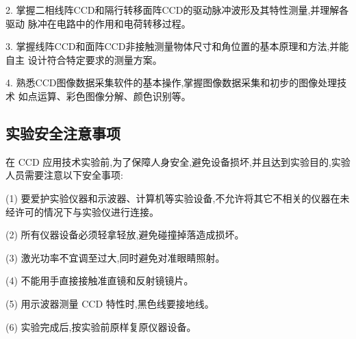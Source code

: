 \documentclass{ctexart}
\begin{document}
2. 掌握二相线阵CCD和隔行转移面阵CCD的驱动脉冲波形及其特性测量,并理解各驱动
脉冲在电路中的作用和电荷转移过程。

3. 掌握线阵CCD和面阵CCD非接触测量物体尺寸和角位置的基本原理和方法,并能自主
设计符合特定要求的测量方案。

4. 熟悉CCD图像数据采集软件的基本操作,掌握图像数据采集和初步的图像处理技术
如点运算、彩色图像分解、颜色识别等。

\subsection{实验安全注意事项}
在 CCD 应用技术实验前,为了保障人身安全,避免设备损坏,并且达到实验目的,实验
人员需要注意以下安全事项:

(1) 要爱护实验仪器和示波器、计算机等实验设备,不允许将其它不相关的仪器在未
经许可的情况下与实验仪进行连接。

(2) 所有仪器设备必须轻拿轻放,避免碰撞掉落造成损坏。

(3) 激光功率不宜调至过大,同时避免对准眼睛照射。

(4) 不能用手直接接触准直镜和反射镜镜片。

(5) 用示波器测量 CCD 特性时,黑色线要接地线。

(6) 实验完成后,按实验前原样复原仪器设备。
\end{document}
